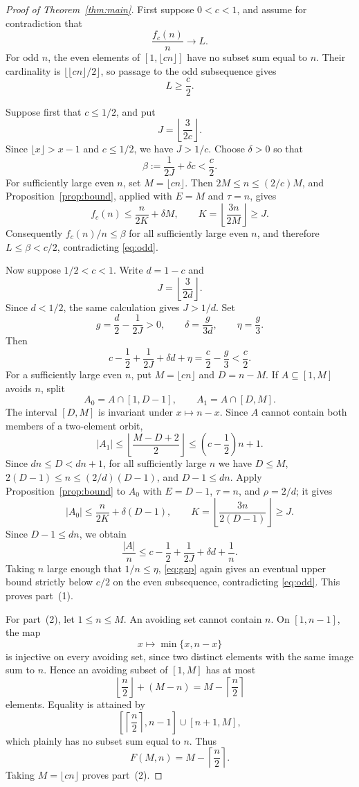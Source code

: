 \documentclass[11pt,reqno]{amsart}
\newcommand{\card}[1]{\lvert #1\rvert}
\begin{document}
\begin{proof}[Proof of Theorem~\ref{thm:main}]
First suppose $0<c<1$, and assume for contradiction that
\[
 \frac{f_c(n)}n\longrightarrow L.
\]
For odd $n$, the even elements of $[1,\lfloor cn\rfloor]$ have no subset sum equal to $n$.  Their cardinality is $\lfloor\lfloor cn\rfloor/2\rfloor$, so passage to the odd subsequence gives
\begin{equation}\label{eq:odd}
 L\geq\frac c2.
\end{equation}

Suppose first that $c\leq1/2$, and put
\[
 J=\left\lfloor\frac{3}{2c}\right\rfloor.
\]
Since $\lfloor x\rfloor>x-1$ and $c\leq1/2$, we have $J>1/c$.  Choose $\delta>0$ so that
\[
 \beta:=\frac1{2J}+\delta c<\frac c2.
\]
For sufficiently large even $n$, set $M=\lfloor cn\rfloor$.  Then $2M\leq n\leq(2/c)M$, and Proposition~\ref{prop:bound}, applied with $E=M$ and $\tau=n$, gives
\[
 f_c(n)\leq \frac{n}{2K}+\delta M,
 \qquad
 K=\left\lfloor\frac{3n}{2M}\right\rfloor\geq J.
\]
Consequently $f_c(n)/n\leq\beta$ for all sufficiently large even $n$, and therefore $L\leq\beta<c/2$, contradicting \eqref{eq:odd}.

Now suppose $1/2<c<1$.  Write $d=1-c$ and
\[
 J=\left\lfloor\frac{3}{2d}\right\rfloor.
\]
Since $d<1/2$, the same calculation gives $J>1/d$.  Set
\[
 g=\frac d2-\frac1{2J}>0,
 \qquad
 \delta=\frac{g}{3d},
 \qquad
 \eta=\frac g3.
\]
Then
\begin{equation}\label{eq:gap}
 c-\frac12+\frac1{2J}+\delta d+\eta
 =\frac c2-\frac g3<\frac c2.
\end{equation}
For a sufficiently large even $n$, put $M=\lfloor cn\rfloor$ and $D=n-M$.  If $A\subseteq[1,M]$ avoids $n$, split
\[
 A_0=A\cap[1,D-1],
 \qquad
 A_1=A\cap[D,M].
\]
The interval $[D,M]$ is invariant under $x\mapsto n-x$.  Since $A$ cannot contain both members of a two-element orbit,
\[
 \card{A_1}\leq\left\lfloor\frac{M-D+2}{2}\right\rfloor
 \leq\left(c-\frac12\right)n+1.
\]
Since $dn\leq D<dn+1$, for all sufficiently large $n$ we have $D\leq M$,
$2(D-1)\leq n\leq(2/d)(D-1)$, and $D-1\leq dn$.  Apply Proposition~\ref{prop:bound} to $A_0$ with $E=D-1$, $\tau=n$, and $\rho=2/d$; it gives
\[
 \card{A_0}\leq\frac{n}{2K}+\delta(D-1),
 \qquad
 K=\left\lfloor\frac{3n}{2(D-1)}\right\rfloor\geq J.
\]
Since $D-1\leq dn$, we obtain
\[
 \frac{\card A}{n}
 \leq c-\frac12+\frac1{2J}+\delta d+\frac1n.
\]
Taking $n$ large enough that $1/n\leq\eta$, \eqref{eq:gap} again gives an eventual upper bound strictly below $c/2$ on the even subsequence, contradicting \eqref{eq:odd}.  This proves part~(1).

For part~(2), let $1\leq n\leq M$.  An avoiding set cannot contain $n$.  On $[1,n-1]$, the map
\[
 x\longmapsto\min\{x,n-x\}
\]
is injective on every avoiding set, since two distinct elements with the same image sum to $n$.  Hence an avoiding subset of $[1,M]$ has at most
\[
 \left\lfloor\frac n2\right\rfloor+(M-n)
 =M-\left\lceil\frac n2\right\rceil
\]
elements.  Equality is attained by
\[
 \left[\left\lceil\frac n2\right\rceil,n-1\right]\cup[n+1,M],
\]
which plainly has no subset sum equal to $n$.  Thus
\[
 F(M,n)=M-\left\lceil\frac n2\right\rceil.
\]
Taking $M=\lfloor cn\rfloor$ proves part~(2).
\end{proof}
\end{document}
